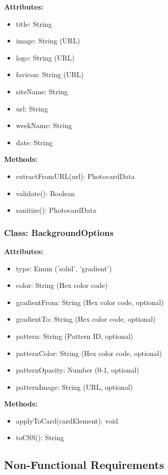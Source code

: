 \documentclass[12pt,a4paper]{article}
\begin{document}
\textbf{Attributes:}
\begin{itemize}
    \item title: String
    \item image: String (URL)
    \item logo: String (URL)
    \item favicon: String (URL)
    \item siteName: String
    \item url: String
    \item weekName: String
    \item date: String
\end{itemize}

\textbf{Methods:}
\begin{itemize}
    \item extractFromURL(url): PhotocardData
    \item validate(): Boolean
    \item sanitize(): PhotocardData
\end{itemize}

\subsubsection{Class: BackgroundOptions}

\textbf{Attributes:}
\begin{itemize}
    \item type: Enum ('solid', 'gradient')
    \item color: String (Hex color code)
    \item gradientFrom: String (Hex color code, optional)
    \item gradientTo: String (Hex color code, optional)
    \item pattern: String (Pattern ID, optional)
    \item patternColor: String (Hex color code, optional)
    \item patternOpacity: Number (0-1, optional)
    \item patternImage: String (URL, optional)
\end{itemize}

\textbf{Methods:}
\begin{itemize}
    \item applyToCard(cardElement): void
    \item toCSS(): String
\end{itemize}

\subsection{Non-Functional Requirements}
\end{document}
